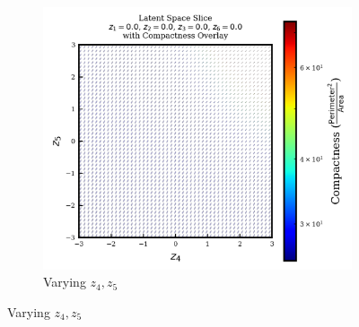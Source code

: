 \documentclass{article}
\begin{document}
\begin{figure}[H]
\begin{subfigure}{0.3\textwidth}
    \end{subfigure}
    \hfill
    \begin{subfigure}{0.3\textwidth}
        \includegraphics[width=\linewidth]{figures/VAEmodels/model5/varying_z4_z5_fixed_z1=0.0_z2=0.0_z3=0.0_z6=0.0.png}
        \caption{Varying $z_4, z_5$}
    \end{subfigure}


\end{figure}
\end{document}
